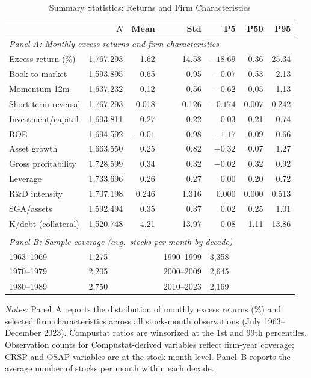 \begin{table}[H]
\centering
\caption{Summary Statistics: Returns and Firm Characteristics}
\label{tab:summary}
\scriptsize\setlength{\tabcolsep}{3pt}\renewcommand{\arraystretch}{0.9}
\begin{tabular}{lrrrrrr}
\toprule
 & $N$ & Mean & Std & P5 & P50 & P95 \\
\midrule
\multicolumn{7}{l}{\textit{Panel A: Monthly excess returns and firm characteristics}} \\
Excess return (\%) & 1,767,293 & 1.62 & 14.58 & $-18.69$ & 0.36 & 25.34 \\
Book-to-market & 1,593,895 & 0.65 & 0.95 & $-0.07$ & 0.53 & 2.13 \\
Momentum 12m & 1,637,232 & 0.12 & 0.56 & $-0.62$ & 0.05 & 1.13 \\
Short-term reversal & 1,767,293 & 0.018 & 0.126 & $-0.174$ & 0.007 & 0.242 \\
Investment/capital & 1,693,811 & 0.27 & 0.22 & 0.03 & 0.21 & 0.74 \\
ROE & 1,694,592 & $-0.01$ & 0.98 & $-1.17$ & 0.09 & 0.66 \\
Asset growth & 1,663,550 & 0.25 & 0.82 & $-0.32$ & 0.07 & 1.27 \\
Gross profitability & 1,728,599 & 0.34 & 0.32 & $-0.02$ & 0.32 & 0.92 \\
Leverage & 1,733,696 & 0.26 & 0.27 & 0.00 & 0.20 & 0.72 \\
R\&D intensity & 1,707,198 & 0.246 & 1.316 & 0.000 & 0.000 & 0.513 \\
SGA/assets & 1,592,494 & 0.35 & 0.37 & 0.02 & 0.25 & 1.01 \\
K/debt (collateral) & 1,520,748 & 4.21 & 13.97 & 0.08 & 1.11 & 13.86 \\
\\[2pt]
\multicolumn{7}{l}{\textit{Panel B: Sample coverage (avg.\ stocks per month by decade)}} \\
1963--1969 & \multicolumn{2}{l}{1,275} & 1990--1999 & \multicolumn{2}{l}{3,358} & \\
1970--1979 & \multicolumn{2}{l}{2,205} & 2000--2009 & \multicolumn{2}{l}{2,645} & \\
1980--1989 & \multicolumn{2}{l}{2,750} & 2010--2023 & \multicolumn{2}{l}{2,169} & \\
\bottomrule
\end{tabular}
\begin{minipage}{\textwidth}
\vspace{2pt}
\scriptsize{}
\textit{Notes:} Panel~A reports the distribution of monthly excess returns (\%) and selected firm characteristics across all stock-month observations (July 1963--December 2023). Compustat ratios are winsorized at the 1st and 99th percentiles. Observation counts for Compustat-derived variables reflect firm-year coverage; CRSP and OSAP variables are at the stock-month level. Panel~B reports the average number of stocks per month within each decade.
\end{minipage}
\end{table}